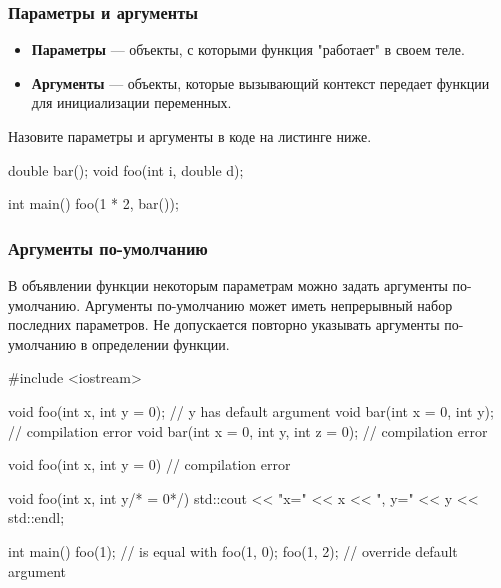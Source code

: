 \documentclass[compress, 8pt]{beamer}
\begin{document}
\begin{frame}[fragile]

    \frametitle{Параметры и аргументы}

    \begin{itemize}

        \item \textbf{Параметры} --- объекты, с которыми функция "работает" в своем теле.

        \item \textbf{Аргументы} --- объекты, которые вызывающий контекст передает функции
            для инициализации переменных.

    \end{itemize}

    \hfill\break
    \begin{task}
        Назовите параметры и аргументы в коде на листинге ниже.
    \end{task}

    \begin{myinplacelisting}[minted language=cpp]
double bar();
void foo(int i, double d);

int main() {
    foo(1 * 2, bar());
}
    \end{myinplacelisting}

\end{frame}

\begin{frame}[fragile]

    \frametitle{Аргументы по-умолчанию}

    \hfill\break
    В объявлении функции некоторым параметрам можно задать аргументы по-умолчанию.
    Аргументы по-умолчанию может иметь непрерывный набор последних параметров.
    Не допускается повторно указывать аргументы по-умолчанию в определении функции.

    \begin{myinplacelisting}[minted language=cpp]
#include <iostream>

void foo(int x, int y = 0); // y has default argument
void bar(int x = 0, int y); // compilation error
void bar(int x = 0, int y, int z = 0); // compilation error

void foo(int x, int y = 0) {} // compilation error

void foo(int x, int y/* = 0*/) {
    std::cout << "x=" << x << ", y=" << y << std::endl;
}

int main() {
    foo(1); // is equal with foo(1, 0);
    foo(1, 2); // override default argument
}
    \end{myinplacelisting}

\end{frame}
\end{document}
